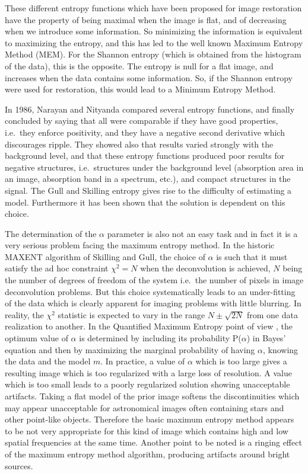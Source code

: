 These different entropy functions  which have
been proposed for image restoration have the property of being maximal when
the image is flat, and of decreasing when we introduce some information.
So minimizing the information is equivalent to maximizing the entropy, and
this has led to the well known Maximum Entropy Method (MEM). For the Shannon
entropy (which is obtained from the histogram of the data), 
this is the opposite. The entropy is null for a flat image, and increases
when the data contains some information. So, if the Shannon entropy were 
used for restoration, this would lead to a Minimum Entropy Method.

In 1986, Narayan and Nityanda \cite{entropy:narrayan86} 
compared several entropy functions,
 and finally 
concluded by saying that all were comparable if they have good
properties, i.e.\ they enforce positivity, and they have a negative 
second derivative which discourages ripple. They showed also that 
results varied strongly with the background level, and
that these entropy functions produced poor results
for negative structures, i.e.\ structures under the background level
(absorption area in an image, absorption band in a spectrum, etc.), and 
compact structures in the signal.
The Gull and Skilling entropy gives rise to  
the difficulty of estimating a model.
Furthermore it has been shown \cite{entropy:bontekoe94} 
that the solution is dependent on this choice.

The determination of the $\alpha$ parameter is also not an easy task and in 
fact it is a very serious problem facing the maximum entropy method.
In the historic MAXENT algorithm of Skilling and Gull, the choice of $\alpha$ 
is such that it must satisfy the ad hoc constraint $\chi^2=N$ when 
the deconvolution is achieved, $N$ being
 the number of degrees of freedom of the system i.e.\ the number of pixels 
in image deconvolution problems.
But this choice systematically leads to an under-fitting of the data 
 \cite{entropy:titterington85} which is clearly apparent for imaging problems 
with little blurring. In reality, the $\chi^2$ statistic is expected to 
vary in the range $N\pm\sqrt{2N}$ from one data realization to another.
 In the Quantified Maximum Entropy point of view \cite{entropy:skilling89}, the 
optimum value of $\alpha$ is determined by including its probability 
P($\alpha$) in Bayes' equation and then by maximizing the marginal 
probability of having $\alpha$, knowing the data and the model $m$.
 In practice, a value of $\alpha$ which is too large gives a resulting image 
which is too regularized
with a large loss of resolution.  A value which is too small
leads to a poorly regularized solution showing unacceptable artifacts. 
Taking a flat model of the prior image softens the discontinuities 
which may appear unacceptable for astronomical images often containing 
stars and other point-like objects. Therefore the basic maximum entropy 
method appears to be not very
appropriate for this kind of image which contains high and low spatial 
frequencies 
at the same time. Another point to be noted 
is a ringing effect of the maximum entropy method algorithm,
producing artifacts around bright sources.

